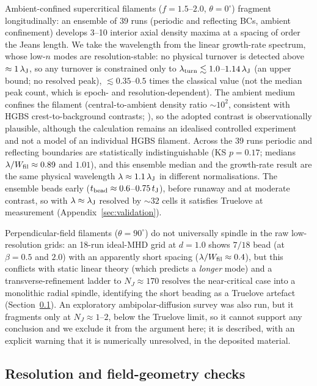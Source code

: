 \documentclass[usenatbib,twoside,twocolumn]{mnras}
\begin{document}
Ambient-confined supercritical filaments ($f=1.5$--$2.0$, $\theta=0^\circ$) fragment longitudinally: an ensemble of 39 runs (periodic and reflecting BCs, ambient confinement) develops 3--10 interior axial density maxima at a spacing of order the Jeans length. We take the wavelength from the linear growth-rate spectrum, whose low-$n$ modes are resolution-stable: no physical turnover is detected above $\approx1\,\lambda_{\rm J}$, so any turnover is constrained only to $\lambda_{\rm turn}\lesssim1.0$--$1.14\,\lambda_{\rm J}$ (an upper bound; no resolved peak), $\lesssim0.35$--$0.5$ times the classical value (not the median peak count, which is epoch- and resolution-dependent). The ambient medium confines the filament (central-to-ambient density ratio $\sim10^2$, consistent with HGBS crest-to-background contrasts; \citealt{Arzoumanian2019}), so the adopted contrast is observationally plausible, although the calculation remains an idealised controlled experiment and not a model of an individual HGBS filament. Across the 39 runs periodic and reflecting boundaries are statistically indistinguishable (KS $p=0.17$; medians $\lambda/W_{\rm fil}\approx0.89$ and $1.01$), and this ensemble median and the growth-rate result are the same physical wavelength $\lambda\approx1.1\,\lambda_{\rm J}$ in different normalisations. The ensemble beads early ($t_{\rm bead}\approx0.6$--$0.75\,t_{\rm J}$), before runaway and at moderate contrast, so with $\lambda\approx\lambda_{\rm J}$ resolved by ${\sim}32$ cells it satisfies Truelove at measurement (Appendix~\ref{sec:validation}).

Perpendicular-field filaments ($\theta=90^\circ$) do not universally spindle in the raw low-resolution grids: an 18-run ideal-MHD grid at $d=1.0$ shows $7/18$ bead (at $\beta=0.5$ and $2.0$) with an apparently short spacing ($\lambda/W_{\rm fil}\approx0.4$), but this conflicts with static linear theory (which predicts a \emph{longer} mode) and a transverse-refinement ladder to $N_J\approx170$ resolves the near-critical case into a monolithic radial spindle, identifying the short beading as a Truelove artefact (Section~\ref{sec:optional_tests}). An exploratory ambipolar-diffusion survey was also run, but it fragments only at $N_J\approx1$--$2$, below the Truelove limit, so it cannot support any conclusion and we exclude it from the argument here; it is described, with an explicit warning that it is numerically unresolved, in the deposited material.

\subsection{Resolution and field-geometry checks}
\label{sec:optional_tests}
\end{document}
